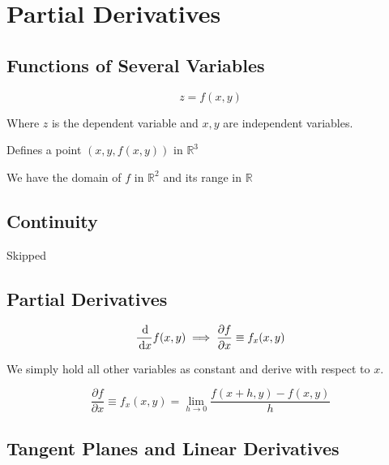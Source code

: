 \chapter{Partial Derivatives}

\section{Functions of Several Variables}

\begin{definition}
	\begin{equation}
		z = f(x, y)
	\end{equation}

	Where $z$ is the dependent variable and $x, y$ are independent variables.

	Defines a point $(x, y, f(x, y))$ in $\mathbb{R}^3$

	We have the domain of $f$ in $\mathbb{R}^2$ and its range in $\mathbb{R}$
\end{definition}

\section{Continuity}

Skipped

\section{Partial Derivatives}

\begin{equation}
	\frac{\D}{\D x} f(x, y) \implies \frac{\partial f}{\partial x} \equiv f_x(x, y)
\end{equation}

We simply hold all other variables as constant and derive with respect to $x$.

\begin{definition}
	\begin{equation}
		\frac{\partial f}{\partial x} \equiv f_x(x, y) = \lim_{h \to 0} \frac{f(x+h, y) - f(x, y)}{h}
	\end{equation}
\end{definition}

\section{Tangent Planes and Linear Derivatives}

